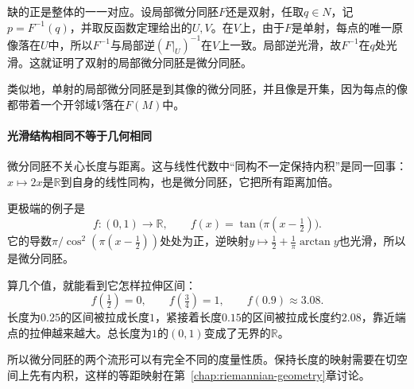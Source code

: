 缺的正是整体的一一对应。设局部微分同胚$F$还是双射，任取$q\in N$，记$p=F^{-1}(q)$，并取反函数定理给出的$U,V$。在$V$上，由于$F$是单射，每点的唯一原像落在$U$中，所以$F^{-1}$与局部逆$(F|_U)^{-1}$在$V$上一致。局部逆光滑，故$F^{-1}$在$q$处光滑。这就证明了双射的局部微分同胚是微分同胚。

类似地，单射的局部微分同胚是到其像的微分同胚，并且像是开集，因为每点的像都带着一个开邻域$V$落在$F(M)$中。

\paragraph{光滑结构相同不等于几何相同}
微分同胚不关心长度与距离。这与线性代数中“同构不一定保持内积”是同一回事：$x\mapsto2x$是$\mathbb R$到自身的线性同构，也是微分同胚，它把所有距离加倍。

更极端的例子是
\[
f:(0,1)\to\mathbb R,\qquad f(x)=\tan\bigl(\pi(x-\tfrac12)\bigr).
\]
它的导数$\pi/\cos^2(\pi(x-\tfrac12))$处处为正，逆映射$y\mapsto\tfrac12+\tfrac1\pi\arctan y$也光滑，所以是微分同胚。

算几个值，就能看到它怎样拉伸区间：
\[
f(\tfrac12)=0,\qquad f(\tfrac34)=1,\qquad f(0.9)\approx3.08.
\]
长度为$0.25$的区间被拉成长度$1$，紧接着长度$0.15$的区间被拉成长度约$2.08$，靠近端点的拉伸越来越大。总长度为$1$的$(0,1)$变成了无界的$\mathbb R$。

所以微分同胚的两个流形可以有完全不同的度量性质。保持长度的映射需要在切空间上先有内积，这样的等距映射在第~\ref{chap:riemannian-geometry}章讨论。
